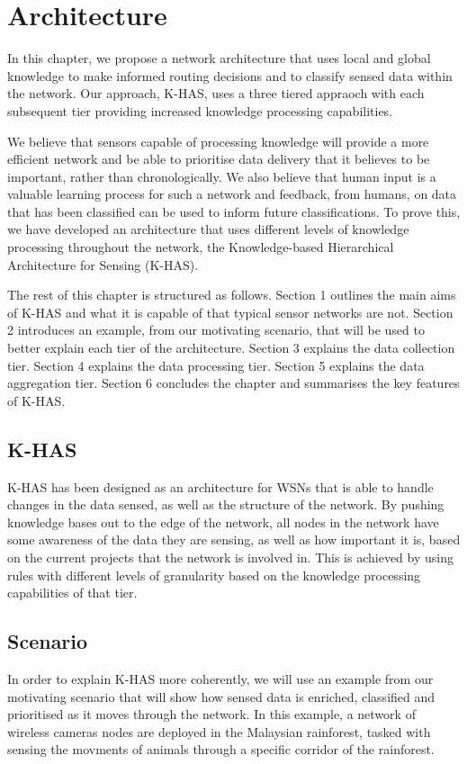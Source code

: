 \chapter{Architecture}
	In this chapter, we propose a network architecture that uses local and global knowledge to make informed routing decisions and to classify sensed data within the network. Our approach, K-HAS, uses a three tiered appraoch with each subsequent tier providing increased knowledge processing capabilities. 

	We believe that sensors capable of processing knowledge will provide a more efficient network and be able to prioritise data delivery that it believes to be important, rather than chronologically. We also believe that human input is a valuable learning process for such a network and feedback, from humans, on data that has been classified can be used to inform future classifications. To prove this, we have developed an architecture that uses different levels of knowledge processing throughout the network, the Knowledge-based Hierarchical Architecture for Sensing (K-HAS).

	The rest of this chapter is structured as follows. Section 1 outlines the main aims of K-HAS and what it is capable of that typical sensor networks are not. Section 2 introduces an example, from our motivating scenario, that will be used to better explain each tier of the architecture. Section 3 explains the data collection tier. Section 4 explains the data processing tier. Section 5 explains the data aggregation tier. Section 6 concludes the chapter and summarises the key features of K-HAS.

	\section{K-HAS}
		K-HAS has been designed as an architecture for WSNs that is able to handle changes in the data sensed, as well as the structure of the network. By pushing knowledge bases out to the edge of the network, all nodes in the network have some awareness of the data they are sensing, as well as how important it is, based on the current projects that the network is involved in. This is achieved by using rules with different levels of granularity based on the knowledge processing capabilities of that tier.
	
	\section{Scenario}
		In order to explain K-HAS more coherently, we will use an example from our motivating scenario that will show how sensed data is enriched, classified and prioritised as it moves through the network. In this example, a network of wireless cameras nodes are deployed in the Malaysian rainforest, tasked with sensing the movments of animals through a specific corridor of the rainforest. 

